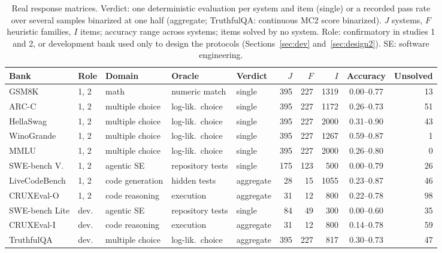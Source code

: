 \begin{table}[tbp]
\centering\scriptsize
\caption{Real response matrices. Verdict: one deterministic evaluation per system and item (single) or a recorded pass rate over several samples binarized at one half (aggregate; TruthfulQA: continuous MC2 score binarized). $J$ systems, $F$ heuristic families, $I$ items; accuracy range across systems; items solved by no system. Role: confirmatory in studies 1 and 2, or development bank used only to design the protocols (Sections~\ref{sec:dev} and~\ref{sec:design2}). SE: software engineering.}
\label{tab:data}
\setlength{\tabcolsep}{2.6pt}
\begin{tabular}{@{}lllllrrrcr@{}}
\toprule
Bank & Role & Domain & Oracle & Verdict & $J$ & $F$ & $I$ & Accuracy & Unsolved \\
\midrule
GSM8K & 1, 2 & math & numeric match & single & 395 & 227 & 1319 & 0.00--0.77 & 13 \\
ARC-C & 1, 2 & multiple choice & log-lik.\ choice & single & 395 & 227 & 1172 & 0.26--0.73 & 51 \\
HellaSwag & 1, 2 & multiple choice & log-lik.\ choice & single & 395 & 227 & 2000 & 0.31--0.90 & 43 \\
WinoGrande & 1, 2 & multiple choice & log-lik.\ choice & single & 395 & 227 & 1267 & 0.59--0.87 & 1 \\
MMLU & 1, 2 & multiple choice & log-lik.\ choice & single & 395 & 227 & 2000 & 0.26--0.80 & 0 \\
SWE-bench V. & 1, 2 & agentic SE & repository tests & single & 175 & 123 & 500 & 0.00--0.79 & 26 \\
LiveCodeBench & 1, 2 & code generation & hidden tests & aggregate & 28 & 15 & 1055 & 0.23--0.87 & 46 \\
CRUXEval-O & 1, 2 & code reasoning & execution & aggregate & 31 & 12 & 800 & 0.22--0.78 & 98 \\
SWE-bench Lite & dev. & agentic SE & repository tests & single & 84 & 49 & 300 & 0.00--0.60 & 35 \\
CRUXEval-I & dev. & code reasoning & execution & aggregate & 31 & 12 & 800 & 0.14--0.78 & 59 \\
TruthfulQA & dev. & multiple choice & log-lik.\ choice & aggregate & 395 & 227 & 817 & 0.30--0.73 & 47 \\
\bottomrule
\end{tabular}
\end{table}
